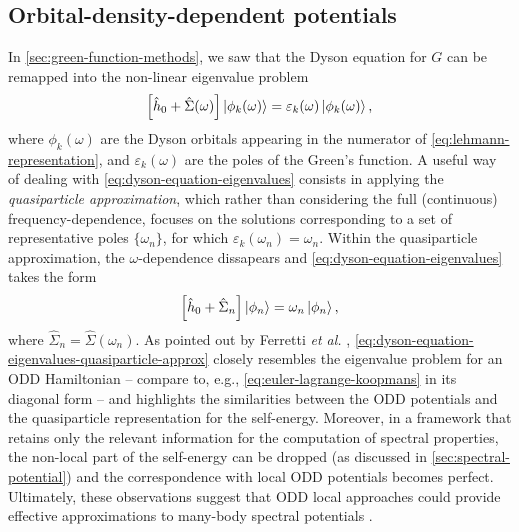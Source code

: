\subsection{Orbital-density-dependent potentials\label{sec:odd-potentials}}
In \cref{sec:green-function-methods}, we saw that the Dyson equation for $G$ can be remapped into the non-linear eigenvalue problem
%
\begin{equation}
    \left[ \hat{h}_0 + \hat{\Sigma}(\omega) \right] \ket{\phi_k(\omega)} = \varepsilon_k(\omega) \ket{\phi_k(\omega)} ,
    \label{eq:dyson-equation-eigenvalues}
\end{equation}
%
where $\phi_k(\omega)$ are the Dyson orbitals appearing in the numerator of \cref{eq:lehmann-representation}, and $\varepsilon_k(\omega)$ are the poles of the Green's function. A useful  way of dealing with \cref{eq:dyson-equation-eigenvalues} consists in applying the \emph{quasiparticle approximation}, which rather than considering the full (continuous) frequency-dependence, focuses on the solutions corresponding to a set of representative poles $\{ \omega_n \}$, for which $\varepsilon_k(\omega_n) = \omega_n$. Within the quasiparticle approximation, the $\omega$-dependence dissapears and \cref{eq:dyson-equation-eigenvalues} takes the form
%
\begin{equation}
    \left[ \hat{h}_0 + \hat{\Sigma}_n \right] \ket{\phi_n} = \omega_n \ket{\phi_n} ,
    \label{eq:dyson-equation-eigenvalues-quasiparticle-approx}
\end{equation}
%
where $\hat{\Sigma}_n = \hat{\Sigma}(\omega_n)$. As pointed out by Ferretti \emph{et al.} \cite{ferretti_bridging_2014}, \cref{eq:dyson-equation-eigenvalues-quasiparticle-approx} closely resembles the eigenvalue problem for an ODD Hamiltonian -- compare to, e.g., \cref{eq:euler-lagrange-koopmans} in its diagonal form -- and highlights the similarities between the ODD potentials and the quasiparticle representation for the self-energy. Moreover, in a framework that retains only the relevant information for the computation of spectral properties, the non-local part of the self-energy can be dropped (as discussed in \cref{sec:spectral-potential}) and the correspondence with local ODD potentials becomes perfect. Ultimately, these observations suggest that ODD local approaches could provide effective approximations to many-body spectral potentials \cite{ferretti_bridging_2014}.

